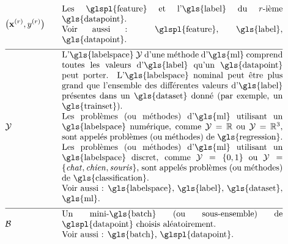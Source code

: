 \begin{align}
	& \big(\featurevec^{(\sampleidx)},\truelabel^{(\sampleidx)}\big) & \quad & \parbox{.75\textwidth}{Les \glspl{feature} et l'\gls{label} du $\sampleidx$-ième \gls{datapoint}. \\ Voir aussi : \glspl{feature}, \gls{label}, \gls{datapoint}.} \nonumber \\[2mm] \hline \nonumber\\[-5mm]
	& \labelspace & \quad & \parbox{.75\textwidth}{
	L’\gls{labelspace} $\labelspace$ d’une méthode d’\gls{ml} comprend toutes les valeurs d'\gls{label} qu’un \gls{datapoint} peut porter. L’\gls{labelspace} nominal peut être plus grand que l’ensemble des différentes valeurs d'\gls{label} présentes dans un \gls{dataset} donné (par exemple, un \gls{trainset}). \\
	Les problèmes (ou méthodes) d'\gls{ml} utilisant un \gls{labelspace} numérique, comme $\labelspace=\mathbb{R}$ ou $\labelspace=\mathbb{R}^{3}$, sont appelés problèmes (ou méthodes) de \gls{regression}. \\
	Les problèmes (ou méthodes) d'\gls{ml} utilisant un \gls{labelspace} discret, comme $\labelspace=\{0,1\}$ ou $\labelspace=\{\mbox{\emph{chat}},\mbox{\emph{chien}},\mbox{\emph{souris}}\}$, sont appelés problèmes (ou méthodes) de \gls{classification}. \\ 
	Voir aussi : \gls{labelspace}, \gls{label}, \gls{dataset}, \gls{ml}.
	} \nonumber \\[2mm] \hline \nonumber\\[-5mm]
	& \batch & \quad & \parbox{.75\textwidth}{Un mini-\gls{batch} (ou sous-ensemble) de \glspl{datapoint} choisis aléatoirement. \\ Voir aussi : \gls{batch}, \glspl{datapoint}.} \nonumber
\end{align}


